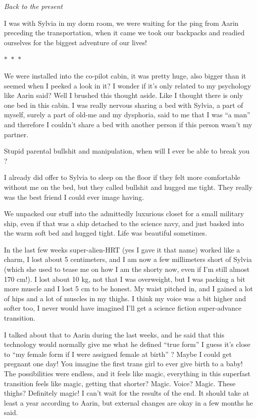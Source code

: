 \documentclass[hidelinks,12pt,a4paper]{book}
\newcommand\sep{\begin{center}
  \boldmath $\ast$~$\ast$~$\ast$
\end{center}}
\begin{document}
\textit{Back to the present}\par
\bigskip

I was with Sylvia in my dorm room, we were waiting for the ping from Aarin preceding the transportation, when 
it came we took our backpacks and readied ourselves for the biggest adventure of our lives!

\sep

We were installed into the co-pilot cabin, it was pretty huge, also bigger than it seemed when I peeked a 
look in it? I wonder if it's only related to my psychology like Aarin said? Well I brushed this thought aside. 
Like I thought there is only one bed in this cabin. I was really nervous sharing a bed with Sylvia, a part 
of myself, surely a part of old-me and my dysphoria, said to me that I was “a man” and therefore I couldn't share
 a bed with another person if this person wasn't my partner. \par
 \bigskip

Stupid parental bullshit and manipulation, when will I ever be able to break you ? \par
\bigskip
I already did offer to Sylvia to sleep on the floor if they felt more comfortable without me on the bed, but 
they called bullshit and hugged me tight. They really was the best friend I could ever image having. \par
\bigskip

We unpacked our stuff into the admittedly luxurious closet for a small military ship, even if that was a ship 
detached to the science navy, and just basked into the warm soft bed and hugged tight. Life was beautiful sometimes. \par
\bigskip

In the last few weeks super-alien-HRT (yes I gave it that name) worked like a charm, I lost about 5 centimeters, 
and I am now a few millimeters short of Sylvia (which she used to tease me on how I am the shorty now, 
even if I'm still almost 170 cm!). I lost about 10 kg, not that I was overweight, but I was packing a bit 
more muscle and I lost 5 cm to be honest. My waist pitched in, and I gained a lot of hips and a lot of muscles in my thighs. 
I think my voice was a bit higher and softer too, I never would have imagined I'll get a science fiction super-advance
 transition. \par
 \bigskip

I talked about that to Aarin during the last weeks, and he said that this technology would normally give me what he 
defined “true form” I guess it's close to “my female form if I were assigned female at birth” ? Maybe I could get 
pregnant one day! You imagine the first trans girl to ever give birth to a baby! The possibilities were endless, 
and it feels like magic, everything in this superfast transition feels like magic, getting that shorter? 
Magic. Voice? Magic. These thighs? Definitely magic! I can't wait for the results of the end. 
It should take at least a year according to Aarin, but external changes are okay in a few months he said.\par
\bigskip
\end{document}
